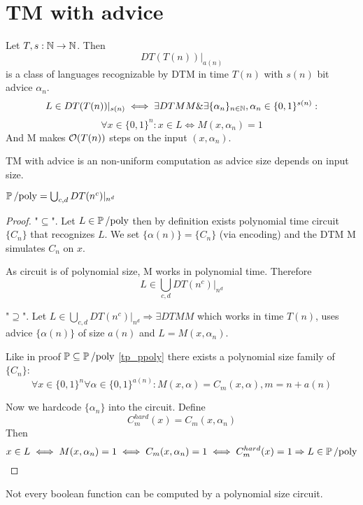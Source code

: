 \section{\texorpdfstring{TM with advice}{TM with advice}}
\vspace{5mm}
\large

\begin{definition}
	Let $T, s: \operatorname{\mathbb{N}} \to \operatorname{\mathbb{N}}$. Then
	\[ DT(T(n))|_{a(n)} \]
	is a class of languages recognizable by DTM in time $T(n)$ with $s(n)$ bit advice $\alpha_n$.
	\[ L \in DT(T(n))|_{s(n)} \iff \exists DTM M \& \exists \{\alpha_n\}_{n \in \operatorname{\mathbb{N}}}, \alpha_n \in \{ 0, 1 \}^{s(n)}: \]
	\[ \forall x \in \{ 0, 1 \}^n: x \in L \iff M(x, \alpha_n) = 1 \]
	And M makes $\mathcal{O}(T(n))$ steps on the input $(x, \alpha_n)$.
\end{definition}

\begin{note}
	TM with advice is an non-uniform computation as advice size depends on input size.
\end{note}

\begin{theorem}[$\Ppoly$]
	$\operatorname{\operatorname{\mathbb{P}}/poly} = \bigcup_{c, d} DT(n^c)|_{n^d} $
\end{theorem}
\begin{proof}
	"$\subseteq$".
	Let $L \in \operatorname{\operatorname{\mathbb{P}}/poly}$ then by definition exists polynomial time circuit $\{ C_n \}$ that recognizes $L$.
	We set $\{ \alpha(n) \} = \{ C_n \}$ (via encoding) and the DTM M simulates $C_n$ on $x$.

	As circuit is of polynomial size, M works in polynomial time.
	Therefore
	\[ L \in \bigcup_{c, d} DT(n^c)|_{n^d} \]

	"$\supseteq$". Let $L \in \bigcup_{c, d} DT(n^c)|_{n^d} \Rightarrow \exists DTM M$ which works in time $T(n)$, uses advice $\{ \alpha(n) \}$ of size $a(n)$ and $L = M(x, \alpha_n)$.

	Like in proof $\operatorname{\mathbb{P}} \subseteq \operatorname{\operatorname{\mathbb{P}}/poly}$ \cref{tp_ppoly} there exists a polynomial size family of $\{ C_n \}$:
	\[ \forall x \in \{ 0, 1 \}^n \forall \alpha \in \{ 0, 1 \}^{a(n)}: M(x, \alpha) = C_m(x, \alpha), m = n + a(n) \]

	Now we hardcode $\{ \alpha_n \}$ into the circuit.
	Define
	\[ C_m^{hard}(x) = C_m(x, \alpha_n) \]
	Then
	\[ x \in L \iff M(x, \alpha_n) = 1 \iff C_m(x, \alpha_n) = 1 \iff C_m^{hard}(x) = 1 \Rightarrow L \in \operatorname{\operatorname{\mathbb{P}}/poly} \]
\end{proof}

\begin{note}
	Not every boolean function can be computed by a polynomial size circuit.
\end{note}

